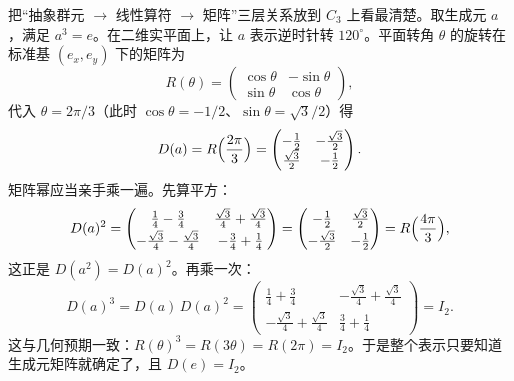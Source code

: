 把“抽象群元 $\to$ 线性算符 $\to$ 矩阵”三层关系放到 $C_3$ 上看最清楚。取生成元 $a$，满足 $a^3=e$。在二维实平面上，让 $a$ 表示逆时针转 $120^\circ$。平面转角 $\theta$ 的旋转在标准基 $(e_x,e_y)$ 下的矩阵为
\[
R(\theta)=
\begin{pmatrix}
\cos\theta&-\sin\theta\\
\sin\theta&\cos\theta
\end{pmatrix},
\]
代入 $\theta=2\pi/3$（此时 $\cos\theta=-1/2$、$\sin\theta=\sqrt3/2$）得
\[
D(a)=R\Bigl(\frac{2\pi}{3}\Bigr)=
\begin{pmatrix}
-\tfrac12&-\tfrac{\sqrt3}{2}\\
\tfrac{\sqrt3}{2}&-\tfrac12
\end{pmatrix}.
\]
矩阵幂应当亲手乘一遍。先算平方：
\[
D(a)^2=
\begin{pmatrix}
\frac14-\frac34 & \frac{\sqrt3}{4}+\frac{\sqrt3}{4}\\[2pt]
-\frac{\sqrt3}{4}-\frac{\sqrt3}{4} & -\frac34+\frac14
\end{pmatrix}
=
\begin{pmatrix}
-\tfrac12&\tfrac{\sqrt3}{2}\\[2pt]
-\tfrac{\sqrt3}{2}&-\tfrac12
\end{pmatrix}
=R\Bigl(\frac{4\pi}{3}\Bigr),
\]
这正是 $D(a^2)=D(a)^2$。再乘一次：
\[
D(a)^3=D(a)\,D(a)^2
=
\begin{pmatrix}
\frac14+\frac34 & -\frac{\sqrt3}{4}+\frac{\sqrt3}{4}\\[2pt]
-\frac{\sqrt3}{4}+\frac{\sqrt3}{4} & \frac34+\frac14
\end{pmatrix}
=I_2.
\]
这与几何预期一致：$R(\theta)^3=R(3\theta)=R(2\pi)=I_2$。于是整个表示只要知道生成元矩阵就确定了，且 $D(e)=I_2$。

